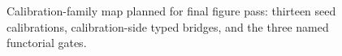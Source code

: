 \begin{figure}[tbp]
  \centering
  \caption{Calibration-family map planned for final figure pass: thirteen seed calibrations, calibration-side typed bridges, and the three named functorial gates.}
  \label{fig:calibration-family-map}
\end{figure}
